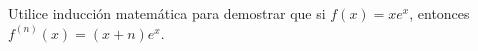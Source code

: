 \item Utilice inducción matemática para demostrar que si $f(x) = xe^x$, entonces $f^{(n)}(x) = (x + n)e^x$.
